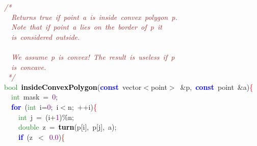 
{\ttfamily \raggedright {
\noindent
\mbox{}\textit{\textcolor{Brown}{/*}} \\
\mbox{}\textit{\textcolor{Brown}{\ \ Returns\ true\ if\ point\ a\ is\ inside\ convex\ polygon\ p.}} \\
\mbox{}\textit{\textcolor{Brown}{\ \ Note\ that\ if\ point\ a\ lies\ on\ the\ border\ of\ p\ it}} \\
\mbox{}\textit{\textcolor{Brown}{\ \ is\ considered\ outside.}} \\
\mbox{} \\
\mbox{}\textit{\textcolor{Brown}{\ \ We\ assume\ p\ is\ convex!\ The\ result\ is\ useless\ if\ p}} \\
\mbox{}\textit{\textcolor{Brown}{\ \ is\ concave.}} \\
\mbox{}\textit{\textcolor{Brown}{\ */}} \\
\mbox{}\textcolor{ForestGreen}{bool}\ \textbf{\textcolor{Black}{insideConvexPolygon}}\textcolor{BrickRed}{(}\textbf{\textcolor{Blue}{const}}\ vector\textcolor{BrickRed}{$<$}point\textcolor{BrickRed}{$>$}\ \textcolor{BrickRed}{\&}p\textcolor{BrickRed}{,}\ \textbf{\textcolor{Blue}{const}}\ point\ \textcolor{BrickRed}{\&}a\textcolor{BrickRed}{)}\textcolor{Red}{\{} \\
\mbox{}\ \ \textcolor{ForestGreen}{int}\ mask\ \textcolor{BrickRed}{=}\ \textcolor{Purple}{0}\textcolor{BrickRed}{;} \\
\mbox{}\ \ \textbf{\textcolor{Blue}{for}}\ \textcolor{BrickRed}{(}\textcolor{ForestGreen}{int}\ i\textcolor{BrickRed}{=}\textcolor{Purple}{0}\textcolor{BrickRed}{;}\ i\textcolor{BrickRed}{$<$}n\textcolor{BrickRed}{;}\ \textcolor{BrickRed}{++}i\textcolor{BrickRed}{)}\textcolor{Red}{\{} \\
\mbox{}\ \ \ \ \textcolor{ForestGreen}{int}\ j\ \textcolor{BrickRed}{=}\ \textcolor{BrickRed}{(}i\textcolor{BrickRed}{+}\textcolor{Purple}{1}\textcolor{BrickRed}{)\%}n\textcolor{BrickRed}{;} \\
\mbox{}\ \ \ \ \textcolor{ForestGreen}{double}\ z\ \textcolor{BrickRed}{=}\ \textbf{\textcolor{Black}{turn}}\textcolor{BrickRed}{(}p\textcolor{BrickRed}{[}i\textcolor{BrickRed}{],}\ p\textcolor{BrickRed}{[}j\textcolor{BrickRed}{],}\ a\textcolor{BrickRed}{);} \\
\mbox{}\ \ \ \ \textbf{\textcolor{Blue}{if}}\ \textcolor{BrickRed}{(}z\ \textcolor{BrickRed}{$<$}\ \textcolor{Purple}{0.0}\textcolor{BrickRed}{)}\textcolor{Red}{\{} \\
}}

